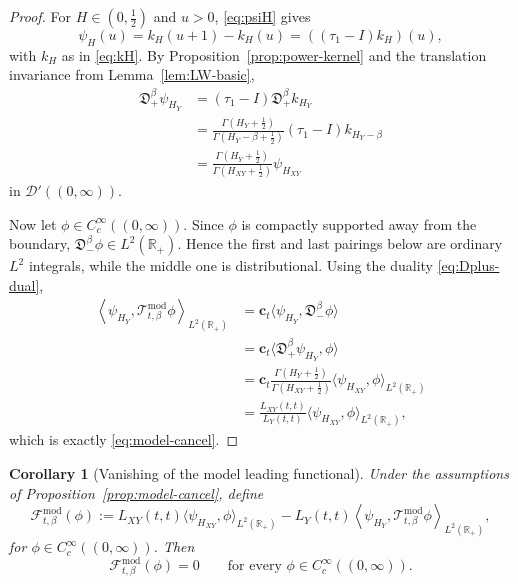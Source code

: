 \documentclass[11pt,a4paper]{amsart}
\theoremstyle{plain}
\newtheorem{corollary}[theorem]{Corollary}
\theoremstyle{definition}
\theoremstyle{remark}
\newcommand{\R}{\mathbb{R}}
\begin{document}
\begin{proof}
For $H\in(0,\tfrac12)$ and $u>0$, \eqref{eq:psiH} gives
\[
\psi_H(u)=k_H(u+1)-k_H(u)=((\tau_1-I)k_H)(u),
\]
with $k_H$ as in \eqref{eq:kH}. By Proposition~\ref{prop:power-kernel} and the translation
invariance from Lemma~\ref{lem:LW-basic},
\begin{align*}
\mathfrak D_+^\beta \psi_{H_Y}
&=
(\tau_1-I)\mathfrak D_+^\beta k_{H_Y} \\
&=
\frac{\Gamma(H_Y+\frac12)}{\Gamma(H_Y-\beta+\frac12)}
(\tau_1-I)k_{H_Y-\beta} \\
&=
\frac{\Gamma(H_Y+\frac12)}{\Gamma(H_{XY}+\frac12)}\psi_{H_{XY}}
\end{align*}
in $\mathcal D'((0,\infty))$.

Now let $\phi\in C_c^\infty((0,\infty))$. Since $\phi$ is compactly supported away from the
boundary, $\mathfrak D_-^\beta\phi\in L^2(\R_+)$. Hence the first and last pairings below
are ordinary $L^2$ integrals, while the middle one is distributional. Using the duality
\eqref{eq:Dplus-dual},
\begin{align*}
\left\langle
\psi_{H_Y},
\mathcal T_{t,\beta}^{\mathrm{mod}}\phi
\right\rangle_{L^2(\R_+)}
&=
\mathbf c_t\langle \psi_{H_Y},\mathfrak D_-^\beta\phi\rangle \\
&=
\mathbf c_t\langle \mathfrak D_+^\beta \psi_{H_Y},\phi\rangle \\
&=
\mathbf c_t
\frac{\Gamma(H_Y+\frac12)}{\Gamma(H_{XY}+\frac12)}
\langle \psi_{H_{XY}},\phi\rangle_{L^2(\R_+)} \\
&=
\frac{L_{XY}(t,t)}{L_Y(t,t)}
\langle \psi_{H_{XY}},\phi\rangle_{L^2(\R_+)},
\end{align*}
which is exactly \eqref{eq:model-cancel}.
\end{proof}

\begin{corollary}[Vanishing of the model leading functional]
\label{cor:model-functional}
Under the assumptions of Proposition~\ref{prop:model-cancel}, define
\begin{equation}\label{eq:model-functional}
\mathcal F_{t,\beta}^{\mathrm{mod}}(\phi)
:=
L_{XY}(t,t)\langle \psi_{H_{XY}},\phi\rangle_{L^2(\R_+)}
-L_Y(t,t)
\left\langle
\psi_{H_Y},
\mathcal T_{t,\beta}^{\mathrm{mod}}\phi
\right\rangle_{L^2(\R_+)},
\end{equation}
for $\phi\in C_c^\infty((0,\infty))$. Then
\[
\mathcal F_{t,\beta}^{\mathrm{mod}}(\phi)=0
\qquad\text{for every }\phi\in C_c^\infty((0,\infty)).
\]
\end{corollary}
\end{document}
